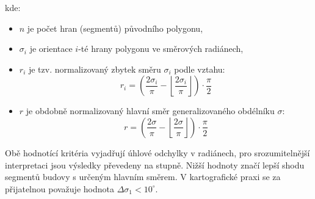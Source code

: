 kde:

\begin{itemize}
    \item $n$ je počet hran (segmentů) původního polygonu,
    \item $\sigma_i$ je orientace $i$-té hrany polygonu ve směrových radiánech,
    \item $r_i$ je tzv. normalizovaný zbytek směru $\sigma_i$ podle vztahu:
    \[
    r_i = \left( \frac{2\sigma_i}{\pi} - \left\lfloor \frac{2\sigma_i}{\pi} \right\rfloor \right) \cdot \frac{\pi}{2}
    \]
    \item $r$ je obdobně normalizovaný hlavní směr generalizovaného obdélníku $\sigma$:
    \[
    r = \left( \frac{2\sigma}{\pi} - \left\lfloor \frac{2\sigma}{\pi} \right\rfloor \right) \cdot \frac{\pi}{2}
    \]
\end{itemize}

Obě hodnotící kritéria vyjadřují úhlové odchylky v radiánech, pro srozumitelnější interpretaci jsou výsledky převedeny na stupně. Nižší hodnoty značí lepší shodu segmentů budovy s určeným hlavním směrem. V kartografické praxi se za přijatelnou považuje hodnota $\Delta \sigma_1 < 10^\circ$.
